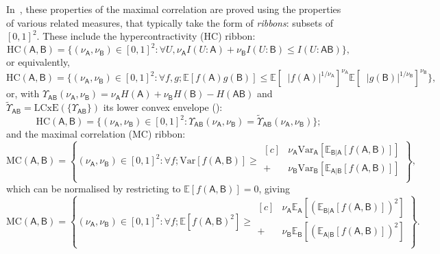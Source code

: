 \documentclass[10pt, a4paper]{article}
\numberwithin{equation}{section} %
\theoremstyle{definition}
\theoremstyle{plain}
\newcommand{\abs}[1]{\mathop{}\left\lvert#1\right\rvert}
\newcommand{\st}{\mathrel{:}} %
\newcommand{\?}{\mathrel{?}} %
\newcommand{\E}{\mathbb{E}} %
\newcommand{\Var}{\mathrm{Var}} %
\newcommand{\crv}[1]{\mathsf{#1}}
\newcommand{\LCxE}[1]{\mathrm{LCxE}\left(#1\right)}
\newcommand{\HC}{\mathrm{HC}}
\newcommand{\MC}{\mathrm{MC}}
\begin{document}
                  In~\cite{NLMonotones}, these properties of the maximal correlation are proved using the properties of various related measures, that typically take the form of \emph{ribbons}: subsets of \({[0,1]}^2\). These include the hypercontractivity (HC) ribbon:
                  \begin{equation}
                    \HC(\crv{A},\crv{B}) = \{(\nu_{\crv{A}}, \nu_{\crv{B}}) \in {[0,1]}^2 \st \forall U, \nu_{\crv{A}} I(U:\crv{A}) + \nu_{\crv{B}} I(U:\crv{B}) \leq I(U:\crv{AB})\},
                  \end{equation}
                  or equivalently,
                  \begin{equation}
                    \HC(\crv{A},\crv{B}) = \{(\nu_{\crv{A}}, \nu_{\crv{B}}) \in {[0,1]}^2 \st \forall f,g; \E[f(\crv{A})g(\crv{B})] \leq {\E[\abs{f(\crv{A})}^{1/\nu_{\crv{A}}}]}^{\nu_{\crv{A}}} {\E[\abs{g(\crv{B})}^{1/\nu_{\crv{B}}}]}^{\nu_{\crv{B}}} \},
                  \end{equation}
                  or, with \(\Upsilon_{\crv{AB}}(\nu_{\crv{A}}, \nu_{\crv{B}}) = \nu_{\crv{A}} H(\crv{A}) + \nu_{\crv{B}} H(\crv{B}) - H(\crv{AB})\) and \(\tilde{\Upsilon}_{\crv{AB}} = \LCxE{\{\Upsilon_{\crv{AB}}\}}\) its lower convex envelope ():
                  \begin{equation}
                    \HC(\crv{A},\crv{B}) = \{(\nu_{\crv{A}}, \nu_{\crv{B}}) \in {[0,1]}^2 \st \Upsilon_{\crv{AB}}(\nu_{\crv{A}}, \nu_{\crv{B}}) = \tilde{\Upsilon}_{\crv{AB}}(\nu_{\crv{A}}, \nu_{\crv{B}}) \};
                  \end{equation}
                  and the maximal correlation (MC) ribbon:
                  \begin{equation}
                    \MC(\crv{A},\crv{B}) = \left\{ 
                      (\nu_{\crv{A}}, \nu_{\crv{B}}) \in {[0,1]}^2 \st \forall f; \Var[f(\crv{A},\crv{B})] \geq 
                      \begin{aligned}[c]
          & \nu_{\crv{A}} \Var_{\crv{A}}[\E_{\crv{B}|\crv{A}}[f(\crv{A},\crv{B})]] \\
                        + & \nu_{\crv{B}} \Var_{\crv{B}}[\E_{\crv{A}|\crv{B}}[f(\crv{A},\crv{B})]] \\
                      \end{aligned}
                    \right\},
                  \end{equation}
                  which can be normalised by restricting to \(\E[f(\crv{A},\crv{B})] = 0\), giving
                  \begin{equation}
                    \MC(\crv{A},\crv{B}) = \left\{(\nu_{\crv{A}}, \nu_{\crv{B}}) \in {[0,1]}^2 \st \forall f; \E[{f(\crv{A},\crv{B})}^2] \geq 
                      \begin{aligned}[c]
          & \nu_{\crv{A}} \E_{\crv{A}}[{(\E_{\crv{B}|\crv{A}}[f(\crv{A},\crv{B})])}^2] \\ + & \nu_{\crv{B}} \E_{\crv{B}}[{(\E_{\crv{A}|\crv{B}}[f(\crv{A},\crv{B})])}^2] \\
                      \end{aligned}
                    \right\}.
                  \end{equation}
\end{document}
